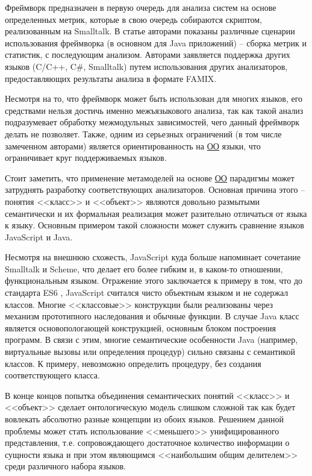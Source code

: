 Фреймворк предназначен в первую очередь для анализа систем на основе определенных метрик,
которые в свою очередь собираются скриптом, реализованным на Smalltalk. В статье авторами показаны
различные сценарии использования фреймворка (в основном для Java приложений) -- сборка метрик и статистик,
с последующим анализом. Авторами заявляется поддержка других языков (C/C++, C\#, Smalltalk) путем использования других анализаторов,
предоставляющих результаты анализа в формате FAMIX.

Несмотря на то, что фреймворк может быть использован для многих языков, его средствами нельзя достичь именно
межъязыкового анализа, так как такой анализ подразумевает обработку межмодульных зависимостей, чего
данный фреймворк делать не позволяет. Также, одним из серьезных ограничений (в том числе замеченном авторами) является
ориентированность на \hyperlink{ОО}{ОО} языки, что ограничивает круг поддерживаемых языков.

Стоит заметить, что применение метамоделей на основе \hyperlink{ОО}{ОО} парадигмы может затруднять
разработку соответствующих анализаторов. Основная причина этого -- понятия <<класс>> и <<объект>> являются довольно
размытыми семантически и их формальная реализация может разительно отличаться от языка к языку.
Основным примером такой сложности может служить сравнение языков JavaScript и Java. 

Несмотря на внешнюю схожесть, JavaScript куда больше напоминает сочетание Smalltalk и Scheme, что делает его более гибким
и, в каком-то отношении, функциональным языком. Отражение этого заключается к примеру в том, что до 
стандарта ES6 \cite{ecma262}, JavaScript считался чисто объектным языком и не содержал классов. Многие
<<классовые>> конструкции были реализованы через механизм прототипного наследования и обычные функции.
В случае Java класс является основопологающей конструкцией, основным блоком построения программ. В связи
с этим, многие семантические особенности Java (например, виртуальные вызовы или определения процедур) сильно
связаны с семантикой классов. К примеру, невозможно определить процедуру, без создания соответствующего класса.

В конце концов попытка объединения семантических понятий <<класс>> и <<объект>> сделает онтологическую модель
слишком сложной так как будет вовлекать абсолютно разные концепции из обоих языков. Решением данной проблемы
может стать использование <<меньшего>> унифицированного представления, т.е. сопровождающего
достаточное количество информации о сущности языка и при этом являющимся <<наибольшим общим делителем>>
среди различного набора языков.

